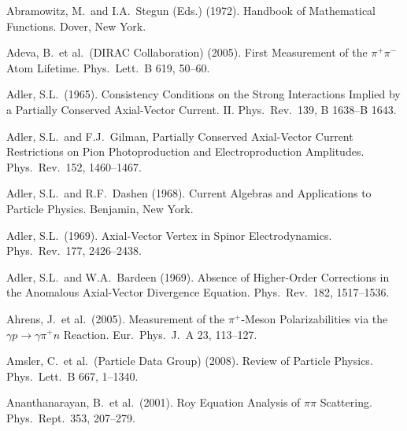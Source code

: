 \documentclass[twoside,12pt]{article}
\begin{document}
\begin{thebibliography}{}

Abramowitz, M.~and I.A.~Stegun (Eds.) (1972).
Handbook of Mathematical Functions. Dover, New York.

Adeva, B.~et al.~(DIRAC Collaboration) (2005).
First Measurement of the $\pi^+\pi^-$ Atom Lifetime.
Phys.\ Lett.\  B 619, 50--60.

Adler, S.L.~(1965).
Consistency Conditions on the Strong Interactions Implied by a
Partially Conserved Axial-Vector Current. II.
Phys.\ Rev.\ 139, B 1638--B 1643.

Adler, S.L.~and F.J.~Gilman,
Partially Conserved Axial-Vector Current Restrictions on Pion
Photoproduction and Electroproduction Amplitudes.
Phys.\ Rev.\  152, 1460--1467.

Adler, S.L.~and R.F.~Dashen (1968).
Current Algebras and Applications to Particle Physics.
Benjamin, New York.

Adler, S.L.~(1969).
Axial-Vector Vertex in Spinor Electrodynamics.
Phys.\ Rev.\ 177, 2426--2438.

Adler, S.L.~and W.A.~Bardeen (1969).
Absence of Higher-Order Corrections in the Anomalous Axial-Vector
Divergence Equation.
Phys.\ Rev.\  182, 1517--1536.

Ahrens, J.~et al.~(2005).
Measurement of the $\pi^+$-Meson Polarizabilities via the $\gamma p\to \gamma
\pi^+ n$ Reaction.
Eur.\ Phys.\ J.\  A 23, 113--127.

Amsler, C.~et al.~(Particle Data Group) (2008).
Review of Particle Physics.
Phys.\ Lett.\ B 667, 1--1340.

Ananthanarayan, B.~et al.~(2001).
Roy Equation Analysis of $\pi \pi$ Scattering.
Phys.\ Rept.\  353, 207--279.


\end{thebibliography}
\end{document}
